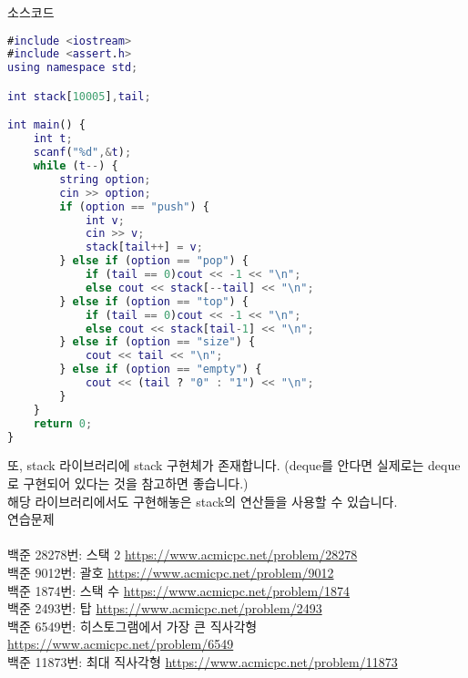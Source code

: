 \documentclass{article}
\begin{document}
\noindent 소스코드\\
\lstset{style=myStyle}
\begin{lstlisting}[caption=소스코드, language=Matlab]
#include <iostream>
#include <assert.h>
using namespace std;

int stack[10005],tail;

int main() {
    int t;
    scanf("%d",&t);
    while (t--) {
        string option;
        cin >> option;
        if (option == "push") {
            int v;
            cin >> v;
            stack[tail++] = v;
        } else if (option == "pop") {
            if (tail == 0)cout << -1 << "\n";
            else cout << stack[--tail] << "\n";
        } else if (option == "top") {
            if (tail == 0)cout << -1 << "\n";
            else cout << stack[tail-1] << "\n";
        } else if (option == "size") {
            cout << tail << "\n";
        } else if (option == "empty") {
            cout << (tail ? "0" : "1") << "\n";
        }
    }
    return 0;
}
\end{lstlisting}

\noindent 또, \<stack 라이브러리에 stack 구현체가 존재합니다. (deque를 안다면 실제로는 deque로 구현되어 있다는 것을 참고하면 좋습니다.)\\
해당 라이브러리에서도 구현해놓은 stack의 연산들을 사용할 수 있습니다.\\


\noindent 연습문제\\\\
백준 28278번: 스택 2 \href{https://www.acmicpc.net/problem/28278}{https://www.acmicpc.net/problem/28278}\\
백준 9012번: 괄호 \href{https://www.acmicpc.net/problem/9012}{https://www.acmicpc.net/problem/9012}\\
백준 1874번: 스택 수 \href{https://www.acmicpc.net/problem/1874}{https://www.acmicpc.net/problem/1874}\\
백준 2493번: 탑 \href{https://www.acmicpc.net/problem/2493}{https://www.acmicpc.net/problem/2493}\\
백준 6549번: 히스토그램에서 가장 큰 직사각형 \href{https://www.acmicpc.net/problem/6549}{https://www.acmicpc.net/problem/6549}\\
백준 11873번: 최대 직사각형 \href{https://www.acmicpc.net/problem/11873}{https://www.acmicpc.net/problem/11873}\\
\end{document}
